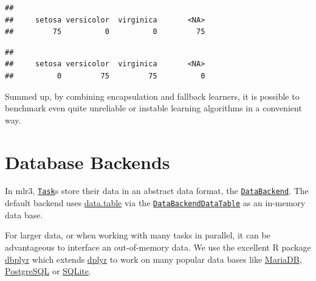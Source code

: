 \documentclass[]{scrbook}
\newenvironment{Shaded}{\begin{snugshade}}{\end{snugshade}}
\newcommand{\CommentTok}[1]{\textcolor[rgb]{0.56,0.35,0.01}{\textit{#1}}}
\newcommand{\DataTypeTok}[1]{\textcolor[rgb]{0.13,0.29,0.53}{#1}}
\newcommand{\KeywordTok}[1]{\textcolor[rgb]{0.13,0.29,0.53}{\textbf{#1}}}
\newcommand{\NormalTok}[1]{#1}
\newcommand{\OperatorTok}[1]{\textcolor[rgb]{0.81,0.36,0.00}{\textbf{#1}}}
\newcommand{\StringTok}[1]{\textcolor[rgb]{0.31,0.60,0.02}{#1}}
\renewenvironment{Shaded} {\begin{snugshade}\small} {\end{snugshade}}
\begin{document}
\begin{verbatim}
## 
##     setosa versicolor  virginica       <NA> 
##         75          0          0         75
\end{verbatim}

\begin{Shaded}
\end{Shaded}

\begin{verbatim}
## 
##     setosa versicolor  virginica       <NA> 
##          0         75         75          0
\end{verbatim}

Summed up, by combining encapsulation and fallback learners, it is possible to benchmark even quite unreliable or instable learning algorithms in a convenient way.

\hypertarget{backends}{%
\section{Database Backends}\label{backends}}

In mlr3, \href{https://mlr3.mlr-org.com/reference/Task.html}{\texttt{Task}}s store their data in an abstract data format, the \href{https://mlr3.mlr-org.com/reference/DataBackend.html}{\texttt{DataBackend}}.
The default backend uses \href{https://cran.r-project.org/package=data.table}{data.table} via the \href{https://mlr3.mlr-org.com/reference/DataBackendDataTable.html}{\texttt{DataBackendDataTable}} as an in-memory data base.

For larger data, or when working with many tasks in parallel, it can be advantageous to interface an out-of-memory data.
We use the excellent R package \href{https://cran.r-project.org/package=dbplyr}{dbplyr} which extends \href{https://cran.r-project.org/package=dplyr}{dplyr} to work on many popular data bases like \href{https://mariadb.org/}{MariaDB}, \href{https://www.postgresql.org/}{PostgreSQL} or \href{https://www.sqlite.org}{SQLite}.
\end{document}
